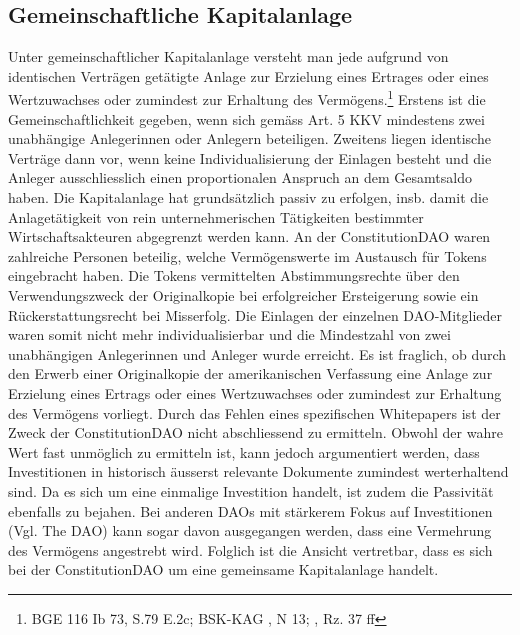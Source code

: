 \documentclass[a4paper,12pt]{report}
\begin{document}
	\subsection{Gemeinschaftliche Kapitalanlage}
	\startsubsection
	Unter gemeinschaftlicher Kapitalanlage versteht man jede aufgrund von identischen Verträgen getätigte Anlage zur Erzielung eines Ertrages oder eines Wertzuwachses oder zumindest zur Erhaltung des Vermögens.\footnote{\hspace{0.5em}BGE 116 Ib 73, S.79 E.2c; BSK-KAG \citeauthor{BSKRP}, N 13; \citeauthor{EG17}, Rz. 37 ff} Erstens ist die Gemeinschaftlichkeit gegeben, wenn sich gemäss Art. 5 KKV mindestens zwei unabhängige Anlegerinnen oder Anlegern beteiligen. Zweitens liegen identische Verträge dann vor, wenn keine Individualisierung der Einlagen besteht und die Anleger ausschliesslich einen proportionalen Anspruch an dem Gesamtsaldo haben. Die Kapitalanlage hat grundsätzlich passiv zu erfolgen, insb. damit die Anlagetätigkeit von rein unternehmerischen Tätigkeiten bestimmter Wirtschaftsakteuren abgegrenzt werden kann. An der ConstitutionDAO waren zahlreiche Personen beteilig, welche Vermögenswerte im Austausch für Tokens eingebracht haben. Die Tokens vermittelten Abstimmungsrechte über den Verwendungszweck der Originalkopie bei erfolgreicher Ersteigerung sowie ein Rückerstattungsrecht bei Misserfolg. Die Einlagen der einzelnen DAO-Mitglieder waren somit nicht mehr individualisierbar und die Mindestzahl von zwei unabhängigen Anlegerinnen und Anleger wurde erreicht. Es ist fraglich, ob durch den Erwerb einer Originalkopie der amerikanischen Verfassung eine Anlage zur Erzielung eines Ertrags oder eines Wertzuwachses oder zumindest zur Erhaltung des Vermögens vorliegt. Durch das Fehlen eines spezifischen Whitepapers ist der Zweck der ConstitutionDAO nicht abschliessend zu ermitteln. Obwohl der wahre Wert fast unmöglich zu ermitteln ist, kann jedoch argumentiert werden, dass Investitionen in historisch äusserst relevante Dokumente zumindest werterhaltend sind. Da es sich um eine einmalige Investition handelt, ist zudem die Passivität ebenfalls zu bejahen. Bei anderen DAOs mit stärkerem Fokus auf Investitionen (Vgl. The DAO) kann sogar davon ausgegangen werden, dass eine Vermehrung des Vermögens angestrebt wird. Folglich ist die Ansicht vertretbar, dass es sich bei der ConstitutionDAO um eine gemeinsame Kapitalanlage handelt.
	\closesection 
	
\end{document}
